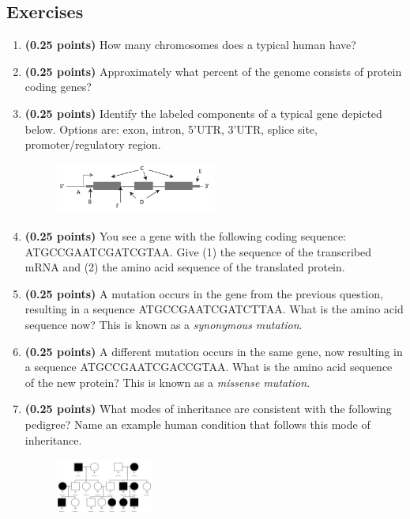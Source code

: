 \documentclass[12pt]{article}
\begin{document}
\subsection*{Exercises}
\begin{enumerate}
\setlength\itemsep{0.0em}

\item \textbf{(0.25 points)} How many chromosomes does a typical human have?

\item \textbf{(0.25 points)} Approximately what percent of the genome consists of protein coding genes?

\item \textbf{(0.25 points)} Identify the labeled components of a typical gene depicted below. Options are: exon, intron, 5'UTR, 3'UTR, splice site, promoter/regulatory region.
\begin{figure}[h!]
\centering
\includegraphics[width=200px]{pset1gene.png}
\end{figure}

\item \textbf{(0.25 points)} You see a gene with the following coding sequence: ATGCCGAATCGATCGTAA. Give (1) the sequence of the transcribed mRNA and (2) the amino acid sequence of the translated protein.

\item \textbf{(0.25 points)} A mutation occurs in the gene from the previous question, resulting in a sequence ATGCCGAATCGATCTTAA. What is the amino acid sequence now? This is known as a \emph{synonymous mutation}.

\item \textbf{(0.25 points)} A different mutation occurs in the same gene, now resulting in a sequence ATGCCGAATCGACCGTAA. What is the amino acid sequence of the new protein? This is known as a \emph{missense mutation}.

\item \textbf{(0.25 points)} What modes of inheritance are consistent with the following pedigree? Name an example human condition that follows this mode of inheritance.
\begin{figure}[h!]
\centering
\includegraphics[width=120px]{pset1recessive.png}
\end{figure}


\end{enumerate}
\end{document}
